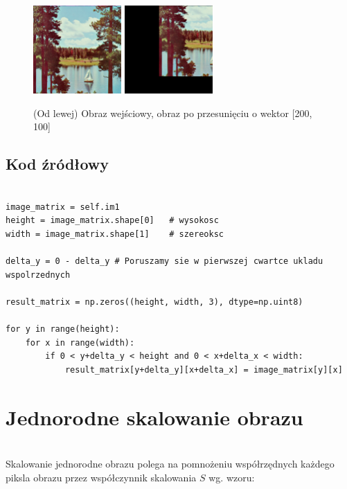 \documentclass[final,a4paper,openany,12pt]{mwbk}
\begin{document}
\begin{figure}[H]
	\begin{center}
		\includegraphics[width=0.3\textwidth]{2/2Geo_Move_Original}
		\includegraphics[width=0.3\textwidth]{2/2Geo_Move_Result}
	\end{center}
	\caption{(Od lewej) Obraz wejściowy, obraz po przesunięciu o wektor [200, 100] }
\end{figure}

\subsection*{Kod źródłowy}

\begin{lstlisting}[caption=Przemieszczenie obrazu o zadany wektor]

image_matrix = self.im1
height = image_matrix.shape[0]   # wysokosc
width = image_matrix.shape[1]    # szereoksc

delta_y = 0 - delta_y # Poruszamy sie w pierwszej cwartce ukladu wspolrzednych

result_matrix = np.zeros((height, width, 3), dtype=np.uint8)

for y in range(height):
    for x in range(width):  
        if 0 < y+delta_y < height and 0 < x+delta_x < width:
            result_matrix[y+delta_y][x+delta_x] = image_matrix[y][x]

\end{lstlisting}
\newpage

\section{ Jednorodne skalowanie obrazu}
\hfill\\
\indent
Skalowanie jednorodne obrazu polega na pomnożeniu współrzędnych każdego piksla obrazu przez współczynnik skalowania $S$ wg. wzoru:
	
\end{document}
